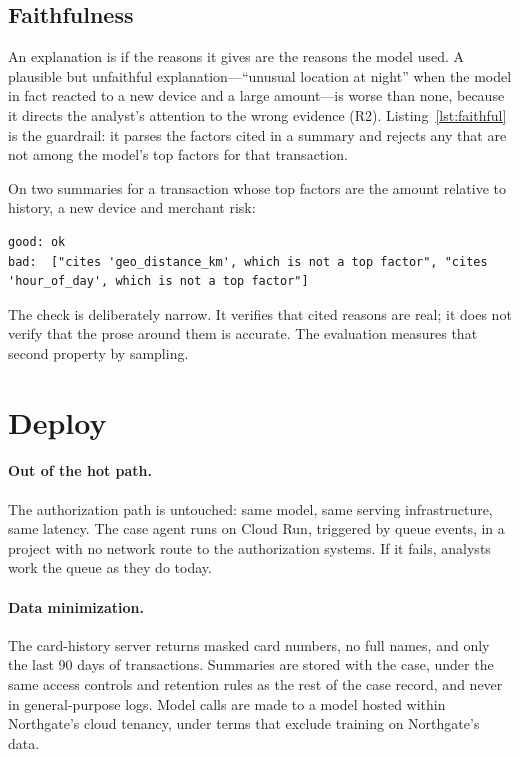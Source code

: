 \subsection{Faithfulness}

An explanation is  if the reasons it gives are the reasons the model used. A plausible but unfaithful explanation---``unusual location at night'' when the model in fact reacted to a new device and a large amount---is worse than none, because it directs the analyst's attention to the wrong evidence (\textsf{R2}). Listing~\ref{lst:faithful} is the guardrail: it parses the factors cited in a summary and rejects any that are not among the model's top factors for that transaction.



On two summaries for a transaction whose top factors are the amount relative to history, a new device and merchant risk:
\begin{lstlisting}[language={}, numbers=none, frame=none, xleftmargin=1.5em]
good: ok
bad:  ["cites 'geo_distance_km', which is not a top factor", "cites 'hour_of_day', which is not a top factor"]
\end{lstlisting}

The check is deliberately narrow. It verifies that cited reasons are real; it does not verify that the prose around them is accurate. The evaluation measures that second property by sampling.

\section{Deploy}
\label{sec:fr-deploy}

\paragraph{Out of the hot path.} The authorization path is untouched: same model, same serving infrastructure, same latency. The case agent runs on Cloud Run, triggered by queue events, in a project with no network route to the authorization systems. If it fails, analysts work the queue as they do today.

\paragraph{Data minimization.} The card-history server returns masked card numbers, no full names, and only the last 90 days of transactions. Summaries are stored with the case, under the same access controls and retention rules as the rest of the case record, and never in general-purpose logs. Model calls are made to a model hosted within Northgate's cloud tenancy, under terms that exclude training on Northgate's data.

